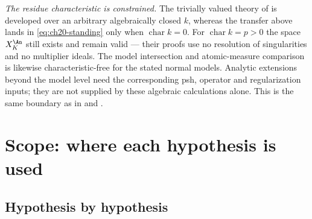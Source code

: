 \emph{The residue characteristic is constrained.}  The trivially valued
theory of  is developed over an arbitrary algebraically
closed $k$, whereas the transfer above lands in
\eqref{eq:ch20-standing} only when $\operatorname{char}k=0$.  For
$\operatorname{char}k=p>0$ the space $X_K^{\An}$ still exists and
 remain valid --- their proofs use no
resolution of singularities and no multiplier ideals.  The model intersection and atomic-measure comparison is likewise
characteristic-free for the stated normal models.  Analytic extensions
beyond the model level need the corresponding psh, operator and
regularization inputs; they are not supplied by these algebraic
calculations alone.  This is the same boundary as in
 and
.

\section{Scope: where each hypothesis is used}
\label{sec:ch30-scope}

\subsection{Hypothesis by hypothesis}
\label{sec:ch30-scope-table}

